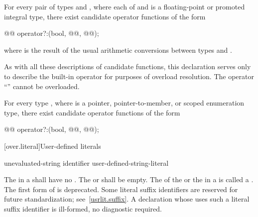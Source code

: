\pnum
For every pair of types  and ,
where each of  and  is a
floating-point or promoted integral type,
there exist candidate operator functions of the form
\begin{codeblock}
@@      operator?:(bool, @@, @@);
\end{codeblock}
where
is the result of the usual arithmetic conversions between types
and
.
\begin{note}
As with all these descriptions of candidate functions, this declaration serves
only to describe the built-in operator for purposes of overload resolution.
The operator
``''
cannot be overloaded.
\end{note}

\pnum
For every type
,
where
is a pointer, pointer-to-member, or scoped enumeration type, there exist candidate operator
functions of the form
\begin{codeblock}
@@       operator?:(bool, @@, @@);
\end{codeblock}%

[over.literal]{User-defined literals}%
%

\begin{bnf}
\br
     unevaluated-string identifier\br
     user-defined-string-literal
\end{bnf}

\pnum
The 
in a 
shall have no .
The  or
 shall be empty.
The  of the  or
the  in a  is called a
.
The first form of  is deprecated.
Some literal suffix identifiers are reserved for future standardization;
see~\ref{usrlit.suffix}.  A declaration whose  uses
such a literal suffix identifier is ill-formed, no diagnostic required.

